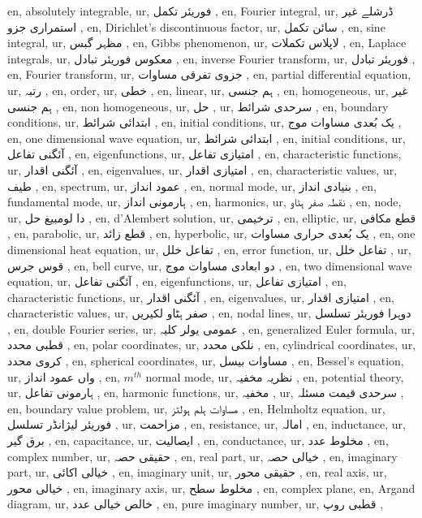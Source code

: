 en, absolutely integrable,
ur, فوریئر تکمل ,
en, ّFourier integral,
ur, ڈرشلے غیر استمراری جزو ,
en, Dirichlet's discontinuous factor,
ur, سائن تکمل ,
en, sine integral,
ur, مظہر گبس ,
en, Gibbs phenomenon,
ur, لاپلاس تکملات ,
en, Laplace integrals,
ur, معکوس فوریئر تبادل ,
en, inverse Fourier transform,
ur, فوریئر تبادل ,
en, Fourier transform,
ur, جزوی تفرقی مساوات ,
en, partial differential equation,
ur, رتبہ ,
en, order,
ur, خطی ,
en, linear,
ur, ہم جنسی ,
en, homogeneous,
ur, غیر ہم جنسی ,
en, non homogeneous,
ur, حل ,
ur, سرحدی شرائط ,
en, boundary conditions,
ur, ابتدائی شرائط ,
en, initial conditions,
ur, یک بُعدی مساوات موج ,
en, one dimensional wave equation,
ur, ابتدائی شرائط ,
en, initial conditions,
ur, آئگنی تفاعل ,
en, eigenfunctions,
ur, امتیازی تفاعل ,
en, characteristic functions,
ur, آئگنی اقدار ,
en, eigenvalues,
ur, امتیازی اقدار ,
en, characteristic values,
ur, طیف ,
en, spectrum,
ur, عمود انداز ,
en, normal mode,
ur, بنیادی انداز ,
en, fundamental mode,
ur, ہارمونی انداز ,
en, harmonics,
ur, نقطہ صفر ہٹاو ,
en, node,
ur, دا لومبیغ حل ,
en, d'Alembert solution,
ur, ترخیمی ,
en, elliptic,
ur, قطع مکافی ,
en, parabolic,
ur, قطع زائد ,
en, hyperbolic,
ur, یک بُعدی حراری مساوات ,
en, one dimensional heat equation,
ur, تفاعل خلل ,
en, error function,
ur, تفاعل خلل ,
ur, قوس جرس ,
en, bell curve,
ur, دو ابعادی مساوات موج ,
en, two dimensional wave equation,
ur, آئگنی تفاعل ,
en, eigenfunctions,
ur, امتیازی تفاعل ,
en, characteristic functions,
ur, آئگنی اقدار ,
en, eigenvalues,
ur, امتیازی اقدار ,
en, characteristic values,
ur, صفر ہٹاو لکیریں ,
en, nodal lines,
ur, دوہرا فوریئر تسلسل ,
en, double Fourier series,
ur, عمومی یولر کلیہ ,
en, generalized Euler formula,
ur, قطبی محدد ,
en, polar coordinates,
ur, نلکی محدد ,
en, cylindrical coordinates,
ur, کروی محدد ,
en, spherical coordinates,
ur, مساوات بیسل ,
en, Bessel's equation,
ur,  واں عمود انداز ,
en, $m^{th}$ normal mode,
ur, نظریہ مخفیہ ,
en, potential theory,
ur, ہارمونی تفاعل ,
en, harmonic functions,
ur, مخفیہ ,
ur, سرحدی قیمت مسئلہ ,
en, boundary value problem,
ur, مساوات ہلم ہولٹز ,
en, Helmholtz equation,
ur, فوریئر لیژانڈر تسلسل ,
ur, مزاحمت ,
en, resistance,
ur, امالہ ,
en, inductance,
ur, برق گیر ,
en, capacitance,
ur, ایصالیت ,
en, conductance,
ur, مخلوط عدد ,
en, complex number,
ur, حقیقی حصہ ,
en, real part,
ur, خیالی حصہ ,
en, imaginary part,
ur, خیالی اکائی ,
en, imaginary unit,
ur, حقیقی محور ,
en, real axis,
ur, خیالی محور ,
en, imaginary axis,
ur, مخلوط سطح ,
en, complex plane,
en, Argand diagram,
ur, خالص خیالی عدد ,
en, pure imaginary number,
ur, قطبی روپ ,
